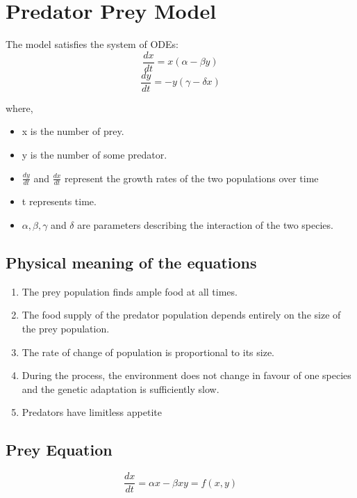 \documentclass{article}
\begin{document}
\newpage

\section{Predator Prey Model}
The model satisfies the
system of ODEs: \\
\begin{equation*}
\frac { d x } { d t } = x ( \alpha - \beta y )
\end{equation*}
\begin{equation*}
\frac { d y } { d t } = - y ( \gamma - \delta x )
\end{equation*}

where,
\begin{itemize}
    \item x is the number of prey.
    \item y is the number of some predator.
    \item $ \frac { d y } { d t } $ and $ \frac { d x } { d t } $ represent the growth rates of the two populations over time
    \item t represents time.
    \item $ \alpha , \beta , \gamma $ and $ \delta $ are parameters describing the interaction of the two species.
\end{itemize}
\subsection*{Physical meaning of the equations}
\begin{enumerate}
    \item The prey population finds ample food at all times.
    \item The food supply of the predator population depends entirely on the size of the prey population.
    \item The rate of change of population is proportional to its size.
    \item During the process, the environment does not change in favour of one species and the genetic adaptation is sufficiently slow.
    \item Predators have limitless appetite

\end{enumerate}

\subsection*{Prey Equation}
\begin{equation*}
     \frac { d x } { d t } = \alpha x - \beta x y = f(x,y)
\end{equation*}
\end{document}
